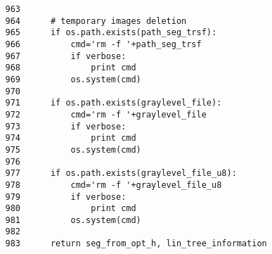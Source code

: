 \documentclass{article}
\begin{document}
\color{black}
\begin{verbatim}  
   963	
   964	    # temporary images deletion
   965	    if os.path.exists(path_seg_trsf):
   966	        cmd='rm -f '+path_seg_trsf
   967	        if verbose:
   968	            print cmd
   969	        os.system(cmd)
   970	
   971	    if os.path.exists(graylevel_file):
   972	        cmd='rm -f '+graylevel_file
   973	        if verbose:
   974	            print cmd
   975	        os.system(cmd)
   976	
   977	    if os.path.exists(graylevel_file_u8):
   978	        cmd='rm -f '+graylevel_file_u8
   979	        if verbose:
   980	            print cmd
   981	        os.system(cmd)
   982	
   983	    return seg_from_opt_h, lin_tree_information
\end{verbatim}







\end{document}

